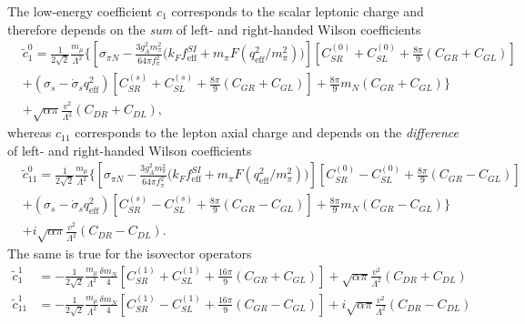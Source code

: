 \documentclass[12pt,letterpaper]{book}
\begin{document}
The low-energy coefficient $c_1$ corresponds to the scalar leptonic charge and therefore depends on the \textit{sum} of left- and right-handed Wilson coefficients
\begin{equation}
\begin{split}
&\tilde{c}_1^0=\frac{1}{2\sqrt{2}}\frac{m_{\mu}}{\Lambda^2}\bigg\{\left[\sigma_{\pi N}-\frac{3g_A^2m_{\pi}^2}{64\pi f_{\pi}^2}\Big(k_Ff_\mathrm{eff}^{SI}+m_{\pi}F\left(q_\mathrm{eff}^2/m_{\pi}^2\right)\Big)\right]\left[C_{SR}^{(0)}+C_{SL}^{(0)}+\frac{8\pi}{9}(C_{GR}+C_{GL})\right]\\
&+\left(\sigma_s-\dot{\sigma}_sq_\mathrm{eff}^2\right)\left[C_{SR}^{(s)}+C_{SL}^{(s)}+\frac{8\pi}{9}\left(C_{GR}+C_{GL}\right)\right]+\frac{8\pi}{9}m_N\left(C_{GR}+C_{GL}\right)\bigg\}\\
&+\sqrt{\alpha\pi}\frac{v^2}{\Lambda^2}\left(C_{DR}+C_{DL}\right),
\end{split}
\end{equation}
whereas $c_{11}$ corresponds to the lepton axial charge and depends on the \textit{difference} of left- and right-handed Wilson coefficients
\begin{equation}
\begin{split}
&\tilde{c}_{11}^0=\frac{1}{2\sqrt{2}}\frac{m_{\mu}}{\Lambda^2}\bigg\{\left[\sigma_{\pi N}-\frac{3g_A^2m_{\pi}^2}{64\pi f_{\pi}^2}\Big(k_Ff_\mathrm{eff}^{SI}+m_{\pi}F\left(q_\mathrm{eff}^2/m_{\pi}^2\right)\Big)\right]\left[C_{SR}^{(0)}-C_{SL}^{(0)}+\frac{8\pi}{9}(C_{GR}-C_{GL})\right]\\
&+\left(\sigma_s-\dot{\sigma}_sq_\mathrm{eff}^2\right)\left[C_{SR}^{(s)}-C_{SL}^{(s)}+\frac{8\pi}{9}\left(C_{GR}-C_{GL}\right)\right]+\frac{8\pi}{9}m_N\left(C_{GR}-C_{GL}\right)\bigg\}\\
&+i\sqrt{\alpha\pi}\frac{v^2}{\Lambda^2}\left(C_{DR}-C_{DL}\right).
\end{split}
\end{equation}
The same is true for the isovector operators
\begin{equation}
\begin{split}
\tilde{c}_1^1&=-\frac{1}{2\sqrt{2}}\frac{m_{\mu}}{\Lambda^2}\frac{\delta m_N}{4}\left[C_{SR}^{(1)}+C_{SL}^{(1)}+\frac{16\pi}{9}\left(C_{GR}+C_{GL}\right)\right]+\sqrt{\alpha\pi}\frac{v^2}{\Lambda^2}\left(C_{DR}+C_{DL}\right)\\
\tilde{c}_{11}^1&=-\frac{1}{2\sqrt{2}}\frac{m_{\mu}}{\Lambda^2}\frac{\delta m_N}{4}\left[C_{SR}^{(1)}-C_{SL}^{(1)}+\frac{16\pi}{9}\left(C_{GR}-C_{GL}\right)\right]+i\sqrt{\alpha\pi}\frac{v^2}{\Lambda^2}\left(C_{DR}-C_{DL}\right)
\end{split}
\end{equation}
\end{document}
